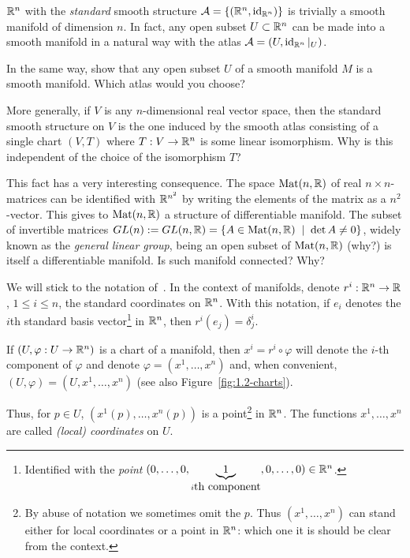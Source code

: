 \begin{exercise}\label{exe:subsetsmanifolds}
  $\mathbb{R}^n$ with the \emph{standard} smooth structure $\mathcal{A}=\{(\mathbb{R}^n, \operatorname{id}_{\mathbb{R}^n})\}$ is trivially a smooth manifold of dimension $n$.
  In fact, any open subset $U\subset\mathbb{R}^n$ can be made into a smooth manifold in a natural way with the atlas $\mathcal{A}=(U, \operatorname{id}_{\mathbb{R}^n}|_U)$.

  In the same way, show that any open subset $U$ of a smooth manifold $M$ is a smooth manifold.
  Which atlas would you choose?

  More generally, if $V$ is any $n$-dimensional real vector space, then the standard smooth structure on $V$ is the one induced by the smooth atlas consisting of a single chart $(V, T)$ where $T: V \to \mathbb{R}^n$ is some linear isomorphism.
  Why is this independent of the choice of the isomorphism $T$?

  This fact has a very interesting consequence.
  The space $\mathrm{Mat}(n, \mathbb{R})$ of real $n\times n$-matrices can be identified with $\mathbb{R}^{n^2}$ by writing the elements of the matrix as a $n^2$-vector.
  This gives to $\mathrm{Mat}(n, \mathbb{R})$ a structure of differentiable manifold.
  The subset of invertible matrices $GL(n) := GL(n, \mathbb{R}) = \{ A \in \mathrm{Mat}(n, \mathbb{R}) \;\mid\; \det A \neq 0\}$, widely known as the \emph{general linear group}, being an open subset of $\mathrm{Mat}(n, \mathbb{R})$ (why?) is itself a differentiable manifold.
  Is such manifold connected? Why?
\end{exercise}

\vspace{1em}
\begin{notation}\label{ntn:coords}
  We will stick to the notation of~\cite{book:tu}.
  In the context of manifolds, denote $r^i: \mathbb{R}^n\to\mathbb{R}$, $1\leq i\leq n$, the standard coordinates on $\mathbb{R}^n$.
  With this notation, if $e_i$ denotes the $i$th standard basis vector\footnote{Identified with the \emph{point} $(0,\ldots,0,\LaTeXunderbrace{1}_{i\mbox{th component}},0,\ldots,0) \in\R^n$.} in $\mathbb{R}^n$, then $r^i(e_j) = \delta^i_j$.

  If $(U, \varphi:U\to\mathbb{R}^n)$ is a chart of a manifold, then $x^i = r^i\circ\varphi$ will denote the $i$-th component of $\varphi$ and denote $\varphi = (x^1, \ldots, x^n)$ and, when convenient, $(U,\varphi) = (U, x^1, \ldots, x^n)$ (see also Figure~\ref{fig:1.2-charts}).

  Thus, for $p\in U$, $(x^1(p), \ldots, x^n(p))$ is a point\footnote{By abuse of notation we sometimes omit the $p$.
    Thus $(x^1, \ldots, x^n)$ can stand either for local coordinates or a point in $\mathbb{R}^n$: which one it is should be clear from the context.} in $\mathbb{R}^n$.
  The functions $x^1, \ldots, x^n$  are called \emph{(local) coordinates} on $U$.
\end{notation}
\vspace{1em}

